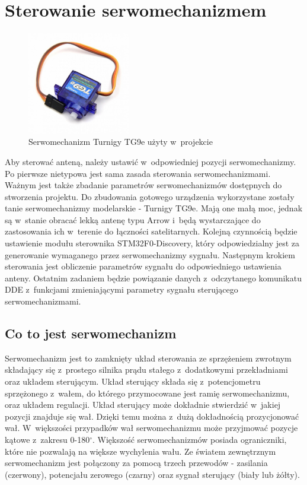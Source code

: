 \documentclass[eng,oneside]{mgr}
\begin{document}
		\section{Sterowanie serwomechanizmem}
		\label{sec:servo_steering}
			\begin{figure}
				\vspace{-20pt}
				\begin{center}
					\includegraphics[width=0.4\textwidth]{servo}
				\end{center}
				\vspace{-20pt}
				\caption{Serwomechanizm Turnigy TG9e użyty w~projekcie}
				\vspace{-10pt}
				\label{fig:servo}
			\end{figure}
		Aby sterować anteną, należy ustawić w~odpowiedniej pozycji serwomechanizmy. Po pierwsze nietypowa jest sama zasada sterowania serwomechanizmami. Ważnym jest także zbadanie parametrów serwomechanizmów dostępnych do stworzenia projektu. Do zbudowania gotowego urządzenia wykorzystane zostały tanie serwomechanizmy modelarskie - Turnigy TG9e. Mają one małą moc, jednak są w~stanie obracać lekką antenę typu Arrow i~będą wystarczające do zastosowania ich w~terenie do łączności satelitarnych. Kolejną czynnością będzie ustawienie modułu sterownika STM32F0-Discovery, który odpowiedzialny jest za generowanie wymaganego przez serwomechanizmy sygnału. Następnym krokiem sterowania jest obliczenie parametrów sygnału do odpowiedniego ustawienia anteny. Ostatnim zadaniem będzie powiązanie danych z~odczytanego komunikatu DDE z~funkcjami zmieniającymi parametry sygnału sterującego serwomechanizmami.

			\subsection{Co to jest serwomechanizm}
			Serwomechanizm jest to zamknięty układ sterowania ze sprzężeniem zwrotnym składający się z~prostego silnika prądu stałego z~dodatkowymi przekładniami oraz układem sterującym. Układ sterujący składa się z~potencjometru sprzężonego z~wałem, do którego przymocowane jest ramię serwomechanizmu, oraz układem regulacji. Układ sterujący może dokładnie stwierdzić w~jakiej pozycji znajduje się wał. Dzięki temu można z~dużą dokładnością prozycjonować wał. W~większości przypadków wał serwomechanizmu może przyjmować pozycje kątowe z~zakresu 0-180$^{\circ}$. Większość serwomechanizmów posiada ograniczniki, które nie pozwalają na większe wychylenia wału. Ze światem zewnętrznym serwomechanizm jest połączony za pomocą trzech przewodów - zasilania (czerwony), potencjału zerowego (czarny) oraz sygnał sterujący (biały lub żółty).
\end{document}

